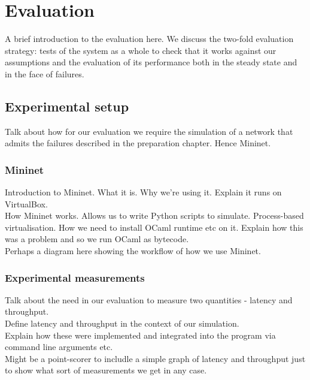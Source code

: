 \chapter{Evaluation}

A brief introduction to the evaluation here. We discuss the two-fold evaluation strategy: tests of the system as a whole to check that it works against our assumptions and the evaluation of its performance both in the steady state and in the face of failures.

\section{Experimental setup}

Talk about how for our evaluation we require the simulation of a network that admits the failures described in the preparation chapter. Hence Mininet.

\subsection{Mininet}

Introduction to Mininet. What it is. Why we're using it. Explain it runs on VirtualBox. \\

How Mininet works. Allows us to write Python scripts to simulate. Process-based virtualisation. How we need to install OCaml runtime etc on it. Explain how this was a problem and so we run OCaml as bytecode. \\

{\color{blue}Perhaps a diagram here showing the workflow of how we use Mininet.}

\subsection{Experimental measurements}

Talk about the need in our evaluation to measure two quantities - latency and throughput. \\

Define latency and throughput in the context of our simulation. \\

Explain how these were implemented and integrated into the program via command line arguments etc. \\

{\color{blue}Might be a point-scorer to includle a simple graph of latency and throughput just to show what sort of measurements we get in any case. \\}

